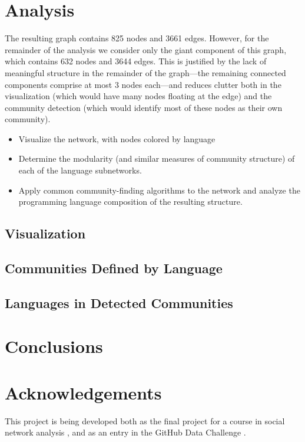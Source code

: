 \documentclass[twocolumn]{article}
\begin{document}
\section{Analysis}
The resulting graph contains 825 nodes and 3661 edges. However, for the
remainder of the analysis we consider only the giant component of this graph,
which contains 632 nodes and 3644 edges. This is justified by the lack of
meaningful structure in the remainder of the graph---the remaining connected
components comprise at most 3 nodes each---and reduces clutter both in the
visualization (which would have many nodes floating at the edge) and the
community detection (which would identify most of these nodes as their own
community).

\begin{itemize}
    \item Visualize the network, with nodes colored by language
    \item Determine the modularity (and similar measures of community structure)
        of each of the language subnetworks.
    \item Apply common community-finding algorithms to the network and analyze
        the programming language composition of the resulting structure.
\end{itemize}

\subsection{Visualization}

\subsection{Communities Defined by Language}

\subsection{Languages in Detected Communities}

\section{Conclusions}

\section{Acknowledgements}
This project is being developed both as the final project for a course in social
network analysis \cite{snacourse}, and as an entry in the GitHub Data Challenge
\cite{doll13}.



\end{document}
